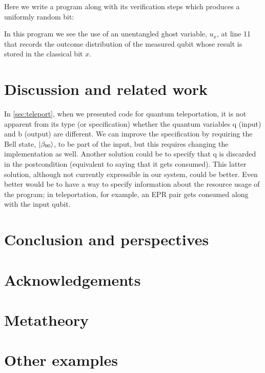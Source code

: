 \documentclass[adraft,creativecommons]{eptcs}
\begin{document}
Here we write a program along with its verification steps which produces a uniformly random bit:



In this program we see the use of an unentangled ghost variable, $u_x$, at line 11 that records the outcome distribution of the measured qubit whose result is stored in the classical bit $x$.

\section{Discussion and related work}

In \cref{sec:teleport}, when we presented code for quantum teleportation, it is not apparent from its type (or specification) whether the quantum variables q (input) and b (output) are different. We can improve the specification by requiring the Bell state, $\ket{\beta_{00}}$, to be part of the input, but this requires changing the implementation as well. Another solution could be to specify that q is discarded in the postcondition (equivalent to saying that it gets consumed). This latter solution, although not currently expressible in our system, could be better. Even better would be to have a way to specify information about the resource usage of the program; in teleportation, for example, an EPR pair gets consumed along with the input qubit.

\section{Conclusion and perspectives}

\blindtext

\section*{Acknowledgements}
\blindtext




\clearpage

\appendix

\section{Metatheory}

\blindtext

\section{Other examples}
\end{document}

